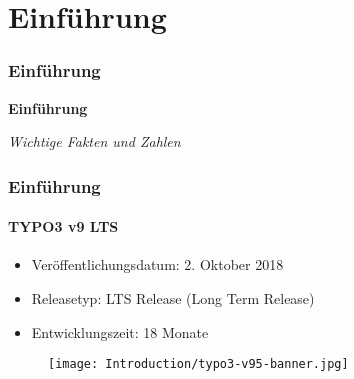 %

\section{Einführung}
\begin{frame}[fragile]
	\frametitle{Einführung}

	\begin{center}\huge{\color{typo3darkgrey}\textbf{Einführung}}\end{center}
	\begin{center}\large{\textit{Wichtige Fakten und Zahlen}}\end{center}

\end{frame}


\begin{frame}[fragile]
	\frametitle{Einführung}
	\framesubtitle{TYPO3 v9 LTS}

	\begin{itemize}
		\item Veröffentlichungsdatum: 2. Oktober 2018
		\item Releasetyp: LTS Release (Long Term Release)
		\item Entwicklungszeit: 18 Monate
	\end{itemize}

	\begin{figure}
		\texttt{[image: Introduction/typo3-v95-banner.jpg]}
	\end{figure}

\end{frame}



